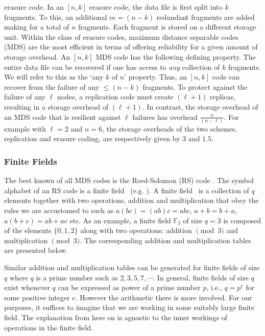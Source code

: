 \begin{multicols}{2}		
\noindent
 erasure code.  In an $[n,k]$ erasure code, the data file is first split into $k$ fragments.  To this, an additional $m=(n-k)$ redundant fragments are added making for a total of $n$ fragments.  Each fragment is stored on a different storage unit. Within the class of erasure codes, maximum distance separable codes (MDS) are the most efficient in terms of offering reliability for a given amount of storage overhead.  An $[n,k]$ MDS code has the following defining property.  The entire data file can be recovered if one has access to {\em any} collection of $k$ fragments.  We will refer to this as the `any $k$ of $n$' property. Thus, an $[n,k]$ code can recover from the failure of any $\leq (n-k)$ fragments. To protect against the failure of any $\ell$ nodes, a replication code must create $(\ell+1)$ replicas, resulting in a storage overhead of $(\ell+1)$. In contrast, the storage overhead of an MDS code that is resilient against $\ell$ failures has overhead $\frac{n}{(n-\ell)}$. For example with $\ell=2$ and $n=6$, the storage overheads of the two schemes, replication and erasure coding, are respectively given by $3$ and $1.5$.\\[-22pt]

\subsubsection{Finite Fields}

\vskip -3pt
	
The best known of all MDS codes is the Reed-Solomon (RS) code \cite{ReeSol}.  The symbol alphabet of an RS code is a finite field \fq\ (e.g. \cite[Ch.~3]{MacSlo}).  A finite field \fq\ is a collection of $q$ elements together with two operations, addition and multiplication that obey the rules we are accustomed to such as $a(bc)=(ab)c=abc$, $a+b=b+a$, $a(b+c)=ab+ac$ etc. As an example, a finite field $\mathbb{F}_3$ of size $q=3$ is composed of the elements $\{0,1,2\}$ along with two operations: addition $\! \! \pmod{3}$ and multiplication $\! \! \pmod{3}$.  The corresponding addition and multiplication tables are presented below.

Similar addition and multiplication tables can be generated for finite fields of size $q$ where $q$ is a prime number such as $2,3,5,7,\cdots$.  In general, finite fields of size $q$ exist whenever $q$ can be expressed as power of a prime number $p$, i.e., $q=p^e$ for some positive integer $e$.  However the arithmetic there is more involved. For our purposes, it suffices to imagine that we are working in some suitably large finite field. The explanation from here on is agnostic to the inner workings of operations in the finite field.\\[-22pt] 


\end{multicols}
